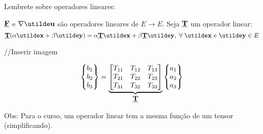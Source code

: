 Lembrete sobre operadores lineares:

$\underline{\mathbf{F}}$ e $\nabla\vt{u}$  são operadores lineares de $E\rightarrow E$. Seja $\underline{\mathbf{T}}$ um operador linear:
\[\ts{T}(\alpha\vt{x}+\beta\vt{y})=\alpha\ts{T}\vt{x}+\beta\ts{T}\vt{y},\;\forall\;\vt{x}\text{ e }\vt{y}\in\text{$E$}\]

//Inserir imagem

\[
	\begin{Bmatrix}
		b_1 \\ b_2 \\ b_3
	\end{Bmatrix}
	=
	\underbrace{
	\begin{bmatrix}
		T_{11} & T_{12} & T_{13} \\
		T_{21} & T_{22} & T_{23} \\
		T_{31} & T_{32} & T_{33}
	\end{bmatrix}
	}_{\displaystyle\underline{\mathbf{T}}}
	\begin{Bmatrix}
		a_1 \\ a_2 \\ a_3
	\end{Bmatrix}
\]

Obs: Para o curso, um operador linear tem a mesma função de um tensor (simplificando).